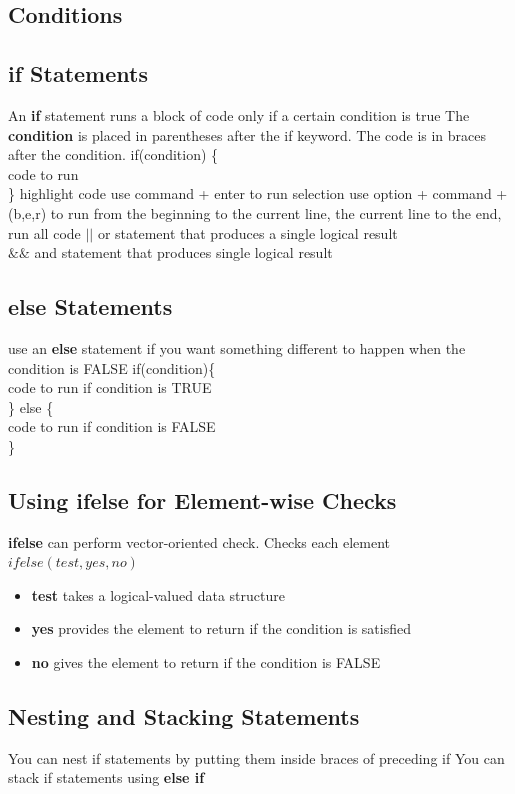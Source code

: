 \documentclass[openany]{book}
\begin{document}
\begin{flushleft}
\section{Conditions}
\subsection{if Statements}
An \textbf{if} statement runs a block of code only if a certain condition is true \medbreak
The \textbf{condition} is placed in parentheses after the if keyword. The code is in braces after the condition. \medbreak
if(condition) \{\\
\quad code to run\\
\} \medbreak
highlight code use command + enter to run selection \medbreak
use option + command + (b,e,r) to run from the beginning to the current line, the current line to the end, run all code \medbreak
$||$ or statement that produces a single logical result\\
$\&\&$ and statement that produces single logical result
\subsection{else Statements}
use an \textbf{else} statement if you want something different to happen when the condition is FALSE \medbreak
if(condition)\{\\
\quad code to run if condition is TRUE\\
\} else \{ \\
\quad code to run if condition is FALSE\\
\}
\subsection{Using ifelse for Element-wise Checks}
\textbf{ifelse} can perform vector-oriented check. Checks each element \medbreak
$ifelse(test,yes,no)$
\begin{itemize}
\item \textbf{test} takes a logical-valued data structure
\item \textbf{yes} provides the element to return if the condition is satisfied
\item \textbf{no} gives the element to return if the condition is FALSE
\end{itemize}
\subsection{Nesting and Stacking Statements}
You can nest if statements by putting them inside braces of preceding if \medbreak
You can stack if statements using \textbf{else if} \medbreak

\end{flushleft}
\end{document}
